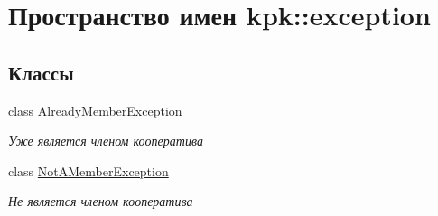 \hypertarget{namespacekpk_1_1exception}{}\section{Пространство имен kpk\+:\+:exception}
\label{namespacekpk_1_1exception}
\subsection*{Классы}
\begin{DoxyCompactItemize}
\item 
class \hyperlink{classkpk_1_1exception_1_1_already_member_exception}{Already\+Member\+Exception}
\begin{DoxyCompactList}\small\item\em Уже является членом кооператива \end{DoxyCompactList}\item 
class \hyperlink{classkpk_1_1exception_1_1_not_a_member_exception}{Not\+A\+Member\+Exception}
\begin{DoxyCompactList}\small\item\em Не является членом кооператива \end{DoxyCompactList}\end{DoxyCompactItemize}
